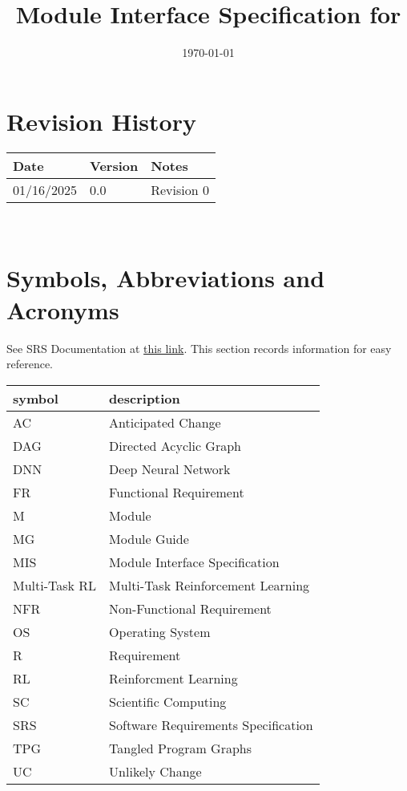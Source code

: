 \documentclass[12pt, titlepage]{article}
\begin{document}
\title{Module Interface Specification for \progname{}}

\author{\authname}

\date{\today}

\maketitle


\section{Revision History}

\begin{tabularx}{\textwidth}{p{3cm}p{2cm}X}
\toprule {\bf Date} & {\bf Version} & {\bf Notes}\\
\midrule
01/16/2025 & 0.0 & Revision 0\\
\bottomrule
\end{tabularx}

~\newpage

\section{Symbols, Abbreviations and Acronyms}

See SRS Documentation at \href{https://github.com/TPGEngine/tpg/blob/main/docs/SRS/SRS.pdf}{this link}. This section records information for easy reference. \\

\renewcommand{\arraystretch}{1.2}
\begin{tabular}{l l} 
  \toprule		
  \textbf{symbol} & \textbf{description}\\
  \midrule 
  AC & Anticipated Change\\
  DAG & Directed Acyclic Graph \\
  DNN & Deep Neural Network \\
  FR & Functional Requirement \\
  M & Module \\
  MG & Module Guide \\
  MIS & Module Interface Specification \\
  Multi-Task RL & Multi-Task Reinforcement Learning \\
  NFR & Non-Functional Requirement \\
  OS & Operating System \\
  R & Requirement\\
  RL & Reinforcment Learning \\
  SC & Scientific Computing \\
  SRS & Software Requirements Specification \\
  TPG & Tangled Program Graphs\\
  UC & Unlikely Change \\
  \bottomrule
\end{tabular}\\
\end{document}
